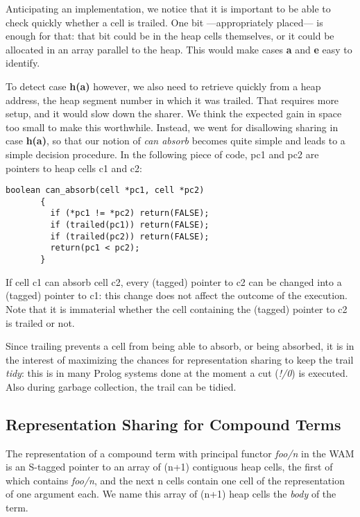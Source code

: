 \documentclass{tlp}
\begin{document}
Anticipating an implementation, we notice that it is important to be
able to check quickly whether a cell is trailed. One bit
---appropriately placed--- is enough for that: that bit could be in
the heap cells themselves, or it could be allocated in an array
parallel to the heap. This would make cases {\bf a} and {\bf e} easy
to identify.

To detect case {\bf h(a)} however, we also need to retrieve quickly
from a heap address, the heap segment number in which it was
trailed. That requires more setup, and it would slow down the
sharer. We think the expected gain in space too small to make this
worthwhile. Instead, we went for disallowing sharing in case {\bf
  h(a)}, so that our notion of {\em can absorb} becomes quite
simple and leads to a simple decision procedure. In the following
piece of code, pc1 and pc2 are pointers to heap cells c1 and c2:

\begin{Verbatim}[fontsize=\small, frame=single,samepage=true]
       boolean can_absorb(cell *pc1, cell *pc2)
       {
         if (*pc1 != *pc2) return(FALSE);
         if (trailed(pc1)) return(FALSE);
         if (trailed(pc2)) return(FALSE);
         return(pc1 < pc2);
       }
\end{Verbatim}

If cell c1 can absorb cell c2, every (tagged) pointer to c2 can be
changed into a (tagged) pointer to c1: this change does not affect the
outcome of the execution. Note that it is immaterial whether the cell
containing the (tagged) pointer to c2 is trailed or not.

Since trailing prevents a cell from being able to absorb, or being
absorbed, it is in the interest of maximizing the chances for
representation sharing to keep the trail {\em tidy}: this is in many
Prolog systems done at the moment a cut ({\em !/0}) is executed. Also during
garbage collection, the trail can be tidied.



\subsection{Representation Sharing for Compound Terms}\label{compoundterms}

The representation of a compound term with principal functor {\em
  foo/n} in the WAM is an S-tagged pointer to an array of (n+1)
contiguous heap cells, the first of which contains {\em foo/n}, and the next
n cells contain one cell of the representation of one argument
each. We name this array of (n+1) heap cells the {\em body} of the
term.
\end{document}

